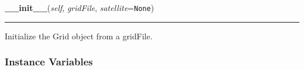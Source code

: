     \label{SatStress:GridCalc:Grid:__init__}

    \vspace{0.5ex}

\hspace{.8\funcindent}\begin{boxedminipage}{\funcwidth}

    \raggedright \textbf{\_\_init\_\_}(\textit{self}, \textit{gridFile}, \textit{satellite}={\tt None})

    \vspace{-1.5ex}

    \rule{\textwidth}{0.5\fboxrule}
\setlength{\parskip}{2ex}
    Initialize the Grid object from a gridFile.

\setlength{\parskip}{1ex}
    \end{boxedminipage}



  \subsubsection{Instance Variables}

